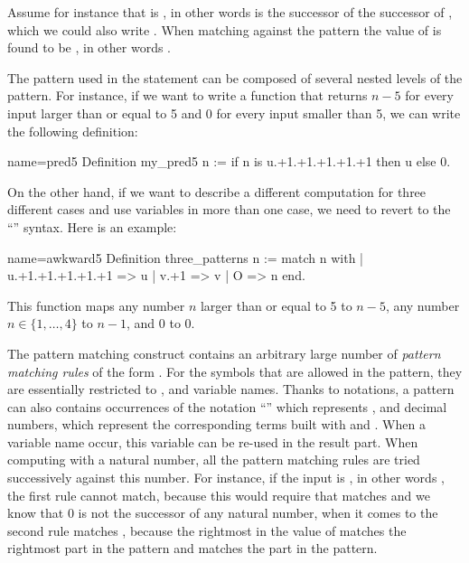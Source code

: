 Assume for instance that  is , in other words  is the
successor of the successor of , which we could also write
.  When matching  against the pattern 
the value of  is found to be , in other words .

The pattern used in the  statement can be composed of
several nested levels of the  pattern.  For instance,
if we want to write a function
that returns \(n-5\) for every input larger than or equal to 5 and 0
for every input smaller than 5, we can write the following definition:

\begin{coq}{name=pred5}{}
Definition my_pred5 n :=
  if n is u.+1.+1.+1.+1.+1 then u else 0.
\end{coq}
On the other hand, if we want to describe a different computation for
three different cases and use variables in more than one case, we need
to revert to the ``'' syntax.  Here is an
example:

\begin{coq}{name=awkward5}{}
Definition three_patterns n :=
  match n with
  | u.+1.+1.+1.+1.+1 => u
  | v.+1 => v
  | O => n
  end.
\end{coq}
This function maps any number \(n\) larger than or equal to 5 to \(n-5\),
any number \(n \in \{1, \ldots, 4\}\) to \(n-1\), and \(0\) to \(0\).

The pattern matching construct 
contains an arbitrary large number of {\em pattern matching rules} of
the form .  For the symbols that are allowed
in the pattern, they are essentially restricted to ,  and
variable names.  Thanks to notations, a pattern can also contains
occurrences of the notation ``'' which represents , and
decimal numbers, which represent the corresponding terms built with
 and .  When a variable name occur, this variable can be
re-used in the result part.  When computing with a natural number, all
the pattern matching rules are tried successively against this number.
For instance, if the input is , in other words , the first
rule cannot match, because this would require that  matches
 and we know that \(0\) is not the successor of any
natural number, when it comes to the second rule  matches
, because the rightmost  in the value of  matches
the rightmost  part in the pattern and  matches the  part
in the pattern.

